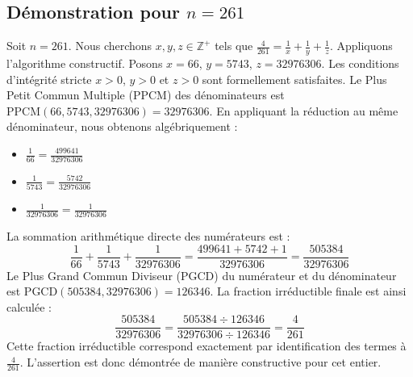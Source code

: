 \documentclass[11pt,a4paper]{article}
\begin{document}
\subsection{Démonstration pour $n = 261$}
Soit $n = 261$. Nous cherchons $x, y, z \in \mathbb{Z}^{+}$ tels que $\frac{4}{261} = \frac{1}{x} + \frac{1}{y} + \frac{1}{z}$.
Appliquons l'algorithme constructif. Posons $x = 66$, $y = 5743$, $z = 32976306$.
Les conditions d'intégrité stricte $x > 0$, $y > 0$ et $z > 0$ sont formellement satisfaites.
Le Plus Petit Commun Multiple (PPCM) des dénominateurs est $\text{PPCM}(66, 5743, 32976306) = 32976306$.
En appliquant la réduction au même dénominateur, nous obtenons algébriquement :
\begin{itemize}
    \item $\frac{1}{66} = \frac{499641}{32976306}$
    \item $\frac{1}{5743} = \frac{5742}{32976306}$
    \item $\frac{1}{32976306} = \frac{1}{32976306}$
\end{itemize}
La sommation arithmétique directe des numérateurs est :
$$ \frac{1}{66} + \frac{1}{5743} + \frac{1}{32976306} = \frac{499641 + 5742 + 1}{32976306} = \frac{505384}{32976306} $$
Le Plus Grand Commun Diviseur (PGCD) du numérateur et du dénominateur est $\text{PGCD}(505384, 32976306) = 126346$.
La fraction irréductible finale est ainsi calculée :
$$ \frac{505384}{32976306} = \frac{505384 \div 126346}{32976306 \div 126346} = \frac{4}{261} $$
Cette fraction irréductible correspond exactement par identification des termes à $\frac{4}{261}$. L'assertion est donc démontrée de manière constructive pour cet entier.
\end{document}
